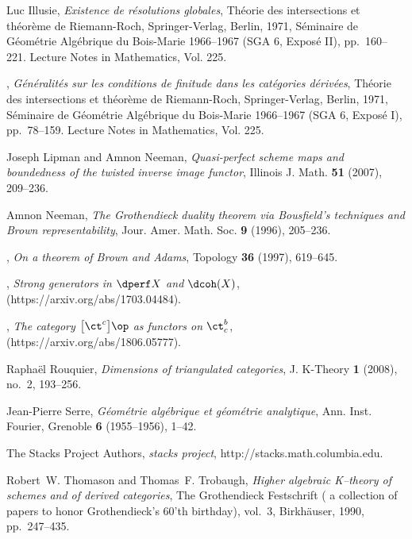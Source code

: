 \documentclass[11pt]{amsart}
\begin{document}
\begin{thebibliography}{10}
Luc Illusie, \emph{Existence de r{\'e}solutions globales}, Th\'eorie des
  intersections et th\'eor\`eme de {R}iemann-{R}och, Springer-Verlag, Berlin,
  1971, S\'eminaire de G\'eom\'etrie Alg\'ebrique du Bois-Marie 1966--1967 (SGA
  6, Expos{\'e} II), pp.~160--221. Lecture Notes in Mathematics, Vol. 225.

\bysame, \emph{G{\'e}n{\'e}ralit{\'e}s sur les conditions de finitude dans les
  cat{\'e}gories d{\'e}riv{\'e}es}, Th\'eorie des intersections et th\'eor\`eme
  de {R}iemann-{R}och, Springer-Verlag, Berlin, 1971, S\'eminaire de
  G\'eom\'etrie Alg\'ebrique du Bois-Marie 1966--1967 (SGA 6, Expos{\'e} I),
  pp.~78--159. Lecture Notes in Mathematics, Vol. 225.

Joseph Lipman and Amnon Neeman, \emph{Quasi-perfect scheme maps and boundedness
  of the twisted inverse image functor}, Illinois J. Math. \textbf{51} (2007),
  209--236.

Amnon Neeman, \emph{The {Grothendieck} duality theorem via {Bousfield's}
  techniques and {Brown} representability}, Jour. Amer. Math. Soc. \textbf{9}
  (1996), 205--236.

\bysame, \emph{On a theorem of {Brown} and {Adams}}, Topology \textbf{36}
  (1997), 619--645.

\bysame, \emph{Strong generators in {$\dperf X$} and {$\dcoh(X)$}},
  (https://arxiv.org/abs/1703.04484).

\bysame, \emph{The category $\big[\ct^c\big]\op$ as functors on $\ct^b_c$},
  (https://arxiv.org/abs/1806.05777).

Rapha{\"e}l Rouquier, \emph{Dimensions of triangulated categories}, J. K-Theory
  \textbf{1} (2008), no.~2, 193--256.

Jean-Pierre Serre, \emph{G\'eom\'etrie alg\'ebrique et g\'eom\'etrie
  analytique}, Ann. Inst. Fourier, Grenoble \textbf{6} (1955--1956), 1--42.

The {Stacks Project Authors}, \emph{\itshape stacks project},
  http://stacks.math.columbia.edu.

Robert~W. Thomason and Thomas~F. Trobaugh, \emph{Higher algebraic {K--theory}
  of schemes and of derived categories}, The Grothendieck Festschrift ( a
  collection of papers to honor Grothendieck's 60'th birthday), vol.~3,
  Birkh{\"a}user, 1990, pp.~247--435.

\end{thebibliography}
\end{document}
